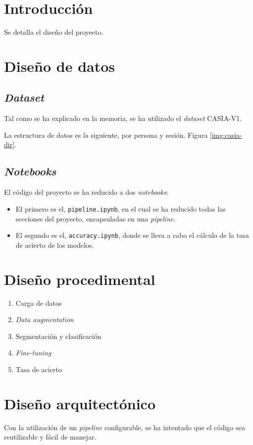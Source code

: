 
\section{Introducción}

Se detalla el diseño del proyecto.

\section{Diseño de datos}

\subsection{\textit{Dataset}} \label{anx:dataset}

Tal como se ha explicado en la memoria, se ha utilizado el \textit{dataset} CASIA-V1.

La estructura de datos es la siguiente, por persona y sesión. Figura \ref{img:casia-dir}.


\subsection{\textit{Notebooks}}

El código del proyecto se ha reducido a dos \textit{notebooks}:


\begin{itemize}
    \item El primero es el, \texttt{pipeline.ipynb}, en el cual se ha reducido todas las secciones del proyecto, encapsuladas en una \textit{pipeline}.
    \item El segundo es el, \texttt{accuracy.ipynb}, donde se lleva a cabo el cálculo de la tasa de acierto de los modelos.
\end{itemize}


\section{Diseño procedimental}

\begin{enumerate}
    \item Carga de datos
    \item \textit{Data augmentation}
    \item Segmentación y clasificación
    \item \textit{Fine-tuning}
    \item Tasa de acierto
    \end{enumerate}

\section{Diseño arquitectónico}

Con la utilización de un \textit{pipeline} configurable, se ha intentado que el código sea reutilizable y fácil de manejar.

